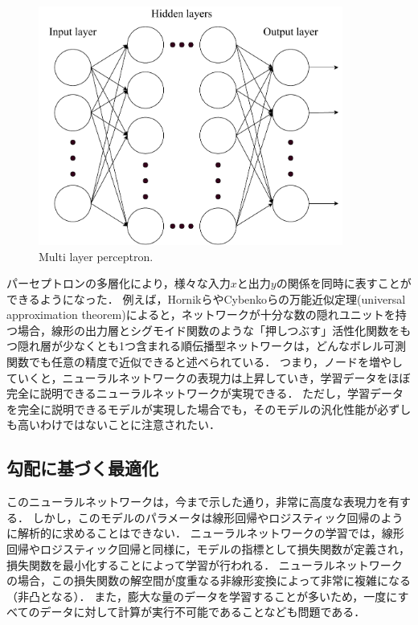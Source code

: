     \begin{figure}[ht]
        \begin{center}
            \centering
            \includegraphics[width=10cm]{8_appendix/img/multi_layer_perceptron.pdf}
            \caption{Multi layer perceptron.}
            \label{fig:mlperceptron}
        \end{center}
    \end{figure}
    パーセプトロンの多層化により，様々な入力$x$と出力$y$の関係を同時に表すことができるようになった．
    例えば，Hornikら\cite{hornik1989multilayer}やCybenko\cite{cybenko1989approximation}らの万能近似定理(universal approximation theorem)によると，ネットワークが十分な数の隠れユニットを持つ場合，線形の出力層とシグモイド関数のような「押しつぶす」活性化関数をもつ隠れ層が少なくとも1つ含まれる順伝播型ネットワークは，どんなボレル可測関数でも任意の精度で近似できると述べられている．
    つまり，ノードを増やしていくと，ニューラルネットワークの表現力は上昇していき，学習データをほぼ完全に説明できるニューラルネットワークが実現できる．
    ただし，学習データを完全に説明できるモデルが実現した場合でも，そのモデルの汎化性能が必ずしも高いわけではないことに注意されたい．

\subsection{勾配に基づく最適化}
    このニューラルネットワークは，今まで示した通り，非常に高度な表現力を有する．
    しかし，このモデルのパラメータは線形回帰やロジスティック回帰のように解析的に求めることはできない．
    ニューラルネットワークの学習では，線形回帰やロジスティック回帰と同様に，モデルの指標として損失関数が定義され，損失関数を最小化することによって学習が行われる．
    ニューラルネットワークの場合，この損失関数の解空間が度重なる非線形変換によって非常に複雑になる（非凸となる）．
    また，膨大な量のデータを学習することが多いため，一度にすべてのデータに対して計算が実行不可能であることなども問題である．
    
